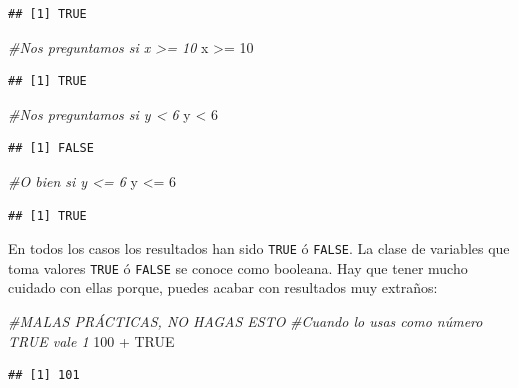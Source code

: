 \documentclass[]{tufte-book}
\newenvironment{Shaded}{}{}
\newcommand{\CommentTok}[1]{\textcolor[rgb]{0.38,0.63,0.69}{\textit{#1}}}
\newcommand{\ConstantTok}[1]{\textcolor[rgb]{0.53,0.00,0.00}{#1}}
\newcommand{\DecValTok}[1]{\textcolor[rgb]{0.25,0.63,0.44}{#1}}
\newcommand{\NormalTok}[1]{#1}
\newcommand{\SpecialCharTok}[1]{\textcolor[rgb]{0.25,0.44,0.63}{#1}}
\begin{document}
\begin{verbatim}
## [1] TRUE
\end{verbatim}

\begin{Shaded}
\begin{Highlighting}[]
\CommentTok{\#Nos preguntamos si x \textgreater{}= 10}
\NormalTok{x }\SpecialCharTok{\textgreater{}=} \DecValTok{10}
\end{Highlighting}
\end{Shaded}

\begin{verbatim}
## [1] TRUE
\end{verbatim}

\begin{Shaded}
\begin{Highlighting}[]
\CommentTok{\#Nos preguntamos si y \textless{} 6}
\NormalTok{y }\SpecialCharTok{\textless{}} \DecValTok{6}
\end{Highlighting}
\end{Shaded}

\begin{verbatim}
## [1] FALSE
\end{verbatim}

\begin{Shaded}
\begin{Highlighting}[]
\CommentTok{\#O bien si y \textless{}= 6}
\NormalTok{y }\SpecialCharTok{\textless{}=} \DecValTok{6}
\end{Highlighting}
\end{Shaded}

\begin{verbatim}
## [1] TRUE
\end{verbatim}

En todos los casos los resultados han sido \texttt{TRUE} ó
\texttt{FALSE}. La clase de variables que toma valores \texttt{TRUE} ó
\texttt{FALSE} se conoce como booleana. Hay que tener mucho cuidado con
ellas porque, puedes acabar con resultados muy extraños:

\begin{Shaded}
\begin{Highlighting}[]
\CommentTok{\#MALAS PRÁCTICAS, NO HAGAS ESTO}
\CommentTok{\#Cuando lo usas como número TRUE vale 1}
\DecValTok{100} \SpecialCharTok{+} \ConstantTok{TRUE}
\end{Highlighting}
\end{Shaded}

\begin{verbatim}
## [1] 101
\end{verbatim}
\end{document}
